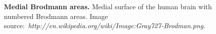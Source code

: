 \begin{figure}[htbp]
	\centering

	\caption[Medial Brodmann areas]{\textbf{Medial Brodmann areas.}
	Medial surface of the human brain with numbered Brodmann areas.
	Image source:~\emph{http://en.wikipedia.org/wiki/Image:Gray727-Brodman.png}.
	\label{fig:appendix:ba-medial}}
\end{figure}

